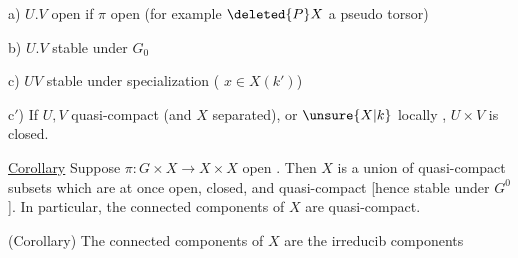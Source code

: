 a) $U.V$ open if $\pi$ open (for example $\deleted{P}X$ a pseudo torsor)

b) $U.V$ stable under $G_0$ 

c) $UV$ stable under specialization  (   $x\in X(k')$) 

c$'$) If $U,V$ quasi-compact (and $X$ separated), or $\unsure{X|k}$ locally , $U\times V$ is closed.

\uline{Corollary} Suppose  $\pi:G\times X\longrightarrow X\times X$ open . Then $X$ is a union of quasi-compact  subsets  which are at once open, closed, and quasi-compact [hence stable under $G^0$]. In particular, the connected components of $X$ are quasi-compact.

(Corollary) The connected components of $X$ are the irreducib components
